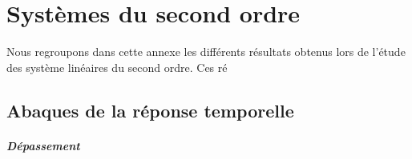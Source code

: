 \chapter{Systèmes du second ordre\label{annexe-2nd}}
Nous regroupons dans cette annexe les différents résultats obtenus lors de 
l'étude des système linéaires du second ordre. Ces ré
\newpage
\section{Abaques de la réponse temporelle}

\paragraph{Dépassement}
\begin{figure}[!h]
\begin{center}
        
\end{center}
\end{figure}

